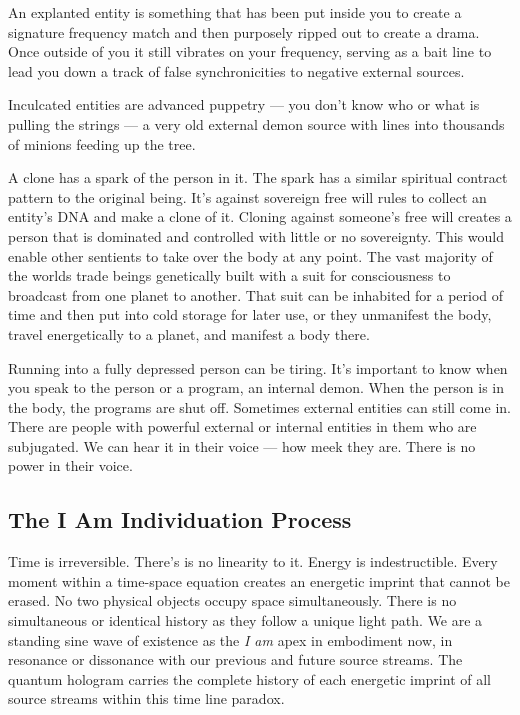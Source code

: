 An explanted entity is something that has been put inside you to create
a signature frequency match and then purposely ripped out to create a
drama. Once outside of you it still vibrates on your frequency, serving
as a bait line to lead you down a track of false synchronicities to
negative external sources.

Inculcated entities are advanced puppetry --- you don't know who or what
is pulling the strings --- a very old external demon source with lines
into thousands of minions feeding up the tree.

A clone has a spark of the person in it. The spark has a similar
spiritual contract pattern to the original being. It's against sovereign
free will rules to collect an entity's DNA and make a clone of it.
Cloning against someone's free will creates a person that is dominated
and controlled with little or no sovereignty. This would enable other
sentients to take over the body at any point. The vast majority of the
worlds trade beings genetically built with a suit for consciousness to
broadcast from one planet to another. That suit can be inhabited for a
period of time and then put into cold storage for later use, or they
unmanifest the body, travel energetically to a planet, and manifest a
body there.

Running into a fully depressed person can be tiring. It's important to
know when you speak to the person or a program, an internal demon. When
the person is in the body, the programs are shut off. Sometimes external
entities can still come in. There are people with powerful external or
internal entities in them who are subjugated. We can hear it in their
voice --- how meek they are. There is no power in their voice.

\subsection{The I Am Individuation
Process}\label{the-i-am-individuation-process}

Time is irreversible. There's is no linearity to it. Energy is
indestructible. Every moment within a time-space equation creates an
energetic imprint that cannot be erased. No two physical objects occupy
space simultaneously. There is no simultaneous or identical history as
they follow a unique light path. We are a standing sine wave of
existence as the \emph{I am} apex in embodiment now, in resonance or
dissonance with our previous and future source streams. The quantum
hologram carries the complete history of each energetic imprint of all
source streams within this time line paradox.

